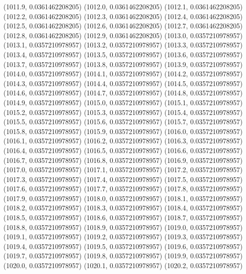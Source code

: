 {					(1011.9, 0.0361462208205)
					(1012.0, 0.0361462208205)
					(1012.1, 0.0361462208205)
					(1012.2, 0.0361462208205)
					(1012.3, 0.0361462208205)
					(1012.4, 0.0361462208205)
					(1012.5, 0.0361462208205)
					(1012.6, 0.0361462208205)
					(1012.7, 0.0361462208205)
					(1012.8, 0.0361462208205)
					(1012.9, 0.0361462208205)
					(1013.0, 0.0357210978957)
					(1013.1, 0.0357210978957)
					(1013.2, 0.0357210978957)
					(1013.3, 0.0357210978957)
					(1013.4, 0.0357210978957)
					(1013.5, 0.0357210978957)
					(1013.6, 0.0357210978957)
					(1013.7, 0.0357210978957)
					(1013.8, 0.0357210978957)
					(1013.9, 0.0357210978957)
					(1014.0, 0.0357210978957)
					(1014.1, 0.0357210978957)
					(1014.2, 0.0357210978957)
					(1014.3, 0.0357210978957)
					(1014.4, 0.0357210978957)
					(1014.5, 0.0357210978957)
					(1014.6, 0.0357210978957)
					(1014.7, 0.0357210978957)
					(1014.8, 0.0357210978957)
					(1014.9, 0.0357210978957)
					(1015.0, 0.0357210978957)
					(1015.1, 0.0357210978957)
					(1015.2, 0.0357210978957)
					(1015.3, 0.0357210978957)
					(1015.4, 0.0357210978957)
					(1015.5, 0.0357210978957)
					(1015.6, 0.0357210978957)
					(1015.7, 0.0357210978957)
					(1015.8, 0.0357210978957)
					(1015.9, 0.0357210978957)
					(1016.0, 0.0357210978957)
					(1016.1, 0.0357210978957)
					(1016.2, 0.0357210978957)
					(1016.3, 0.0357210978957)
					(1016.4, 0.0357210978957)
					(1016.5, 0.0357210978957)
					(1016.6, 0.0357210978957)
					(1016.7, 0.0357210978957)
					(1016.8, 0.0357210978957)
					(1016.9, 0.0357210978957)
					(1017.0, 0.0357210978957)
					(1017.1, 0.0357210978957)
					(1017.2, 0.0357210978957)
					(1017.3, 0.0357210978957)
					(1017.4, 0.0357210978957)
					(1017.5, 0.0357210978957)
					(1017.6, 0.0357210978957)
					(1017.7, 0.0357210978957)
					(1017.8, 0.0357210978957)
					(1017.9, 0.0357210978957)
					(1018.0, 0.0357210978957)
					(1018.1, 0.0357210978957)
					(1018.2, 0.0357210978957)
					(1018.3, 0.0357210978957)
					(1018.4, 0.0357210978957)
					(1018.5, 0.0357210978957)
					(1018.6, 0.0357210978957)
					(1018.7, 0.0357210978957)
					(1018.8, 0.0357210978957)
					(1018.9, 0.0357210978957)
					(1019.0, 0.0357210978957)
					(1019.1, 0.0357210978957)
					(1019.2, 0.0357210978957)
					(1019.3, 0.0357210978957)
					(1019.4, 0.0357210978957)
					(1019.5, 0.0357210978957)
					(1019.6, 0.0357210978957)
					(1019.7, 0.0357210978957)
					(1019.8, 0.0357210978957)
					(1019.9, 0.0357210978957)
					(1020.0, 0.0357210978957)
					(1020.1, 0.0357210978957)
					(1020.2, 0.0357210978957)
}
